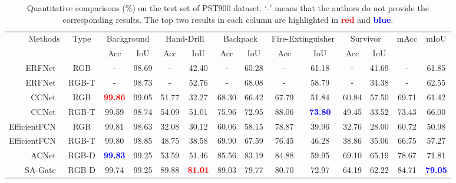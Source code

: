 \documentclass[journal]{IEEEtran}
\begin{document}
\begin{table*}[t!]
  \centering
  \small
  \renewcommand{\arraystretch}{1.4}
  \renewcommand{\tabcolsep}{1.2mm}
  \caption{
    Quantitative comparisons (\%) on the test set of PST900 dataset.
    `-' means that the authors do not provide the corresponding results.
    The top two results in each column are highlighted in \textcolor{red}{\textbf{red}} and \textcolor{blue}{\textbf{blue}}.
    }
\label{table:QuantitativeResults_PST900}
  
\begin{tabular}{r|c|cccccccccccc}
\midrule[1pt]    
 \multirow{2}{*}{\normalsize{Methods}} &  \multirow{2}{*}{\normalsize{Type}}
 & \multicolumn{2}{c}{Background} & \multicolumn{2}{c}{Hand-Drill} & \multicolumn{2}{c}{Backpack} & \multicolumn{2}{c}{Fire-Extinguisher} & \multicolumn{2}{c}{Survivor}   
 & \multirow{2}{*}{\normalsize{mAcc}} & \multirow{2}{*}{\normalsize{mIoU}} \\
 
 \cline{3-12} 
       & & Acc & IoU & Acc & IoU & Acc & IoU & Acc & IoU & Acc & IoU \\
	     
\midrule[1pt] 

ERFNet~\cite{2018ERFNet}   & RGB & - & 98.69 & - & 42.40 & - & 65.28 & - & 61.18 & - & 41.69 & - & 61.85 \\
ERFNet~\cite{2018ERFNet}   & RGB-T & - & 98.73 & - & 52.76 & - & 68.08 & - & 58.79 & - & 34.38 & - & 62.55 \\
\hline
CCNet~\cite{2019CCNet}   & RGB & \textcolor{red}{\textbf{99.86}} & 99.05 & 51.77 & 32.27 & 68.30 & 66.42 & 67.79 & 51.84 & 60.84 & 57.50 & 69.71 & 61.42 \\
CCNet~\cite{2019CCNet}   & RGB-T & 99.59 & 98.74 & 54.09 & 51.01 & 75.96 & 72.95 & 88.06 & \textcolor{blue}{\textbf{73.80}} & 49.45 & 33.52 & 73.43 & 66.00 \\
\hline
EfficientFCN~\cite{2020EfficientFCN}  & RGB & 99.81 & 98.63 & 32.08 & 30.12 & 60.06 & 58.15 & 78.87 & 39.96 & 32.76 & 28.00 & 60.72 & 50.98 \\	
EfficientFCN~\cite{2020EfficientFCN}  & RGB-T & 99.80 & 98.85 & 48.75 & 38.58 & 69.90 & 67.59 & 76.45 & 46.28 & 38.86 & 35.06 & 66.75 & 57.27 \\	
								   						
\hline ACNet~\cite{2019ACNet}       & RGB-D & \textcolor{blue}{\textbf{99.83}}& 99.25 & 53.59 & 51.46 & 85.56 & 83.19 & 84.88 & 59.95 & 69.10 & 65.19 & 78.67 & 71.81 \\	
SA-Gate~\cite{2020SA-Gate}    & RGB-D & 99.74 & 99.25 & 89.88 & \textcolor{red}{\textbf{81.01}} & 89.03 & 79.77 & 80.70 & 72.97 & 64.19 & 62.22 & 84.71 & \textcolor{blue}{\textbf{79.05}} \\	
							   						

\end{tabular}
\end{table*}
\end{document}
